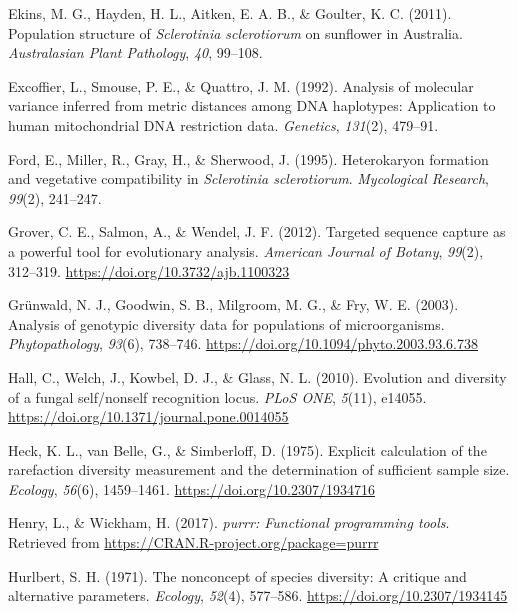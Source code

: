 \documentclass[fleqn,10pt,lineno]{wlpeerj} %
\theoremstyle{definition}
\theoremstyle{definition}
\theoremstyle{definition}
\theoremstyle{remark}
\begin{document}
\hypertarget{ref-ekins2011population}{}
Ekins, M. G., Hayden, H. L., Aitken, E. A. B., \& Goulter, K. C. (2011).
Population structure of \emph{Sclerotinia sclerotiorum} on sunflower in
Australia. \emph{Australasian Plant Pathology}, \emph{40}, 99--108.

\hypertarget{ref-excoffier1992analysis}{}
Excoffier, L., Smouse, P. E., \& Quattro, J. M. (1992). Analysis of
molecular variance inferred from metric distances among DNA haplotypes:
Application to human mitochondrial DNA restriction data.
\emph{Genetics}, \emph{131}(2), 479--91.

\hypertarget{ref-ford1995heterokaryon}{}
Ford, E., Miller, R., Gray, H., \& Sherwood, J. (1995). Heterokaryon
formation and vegetative compatibility in \emph{Sclerotinia
sclerotiorum}. \emph{Mycological Research}, \emph{99}(2), 241--247.

\hypertarget{ref-grover2012targeted}{}
Grover, C. E., Salmon, A., \& Wendel, J. F. (2012). Targeted sequence
capture as a powerful tool for evolutionary analysis. \emph{American
Journal of Botany}, \emph{99}(2), 312--319.
\url{https://doi.org/10.3732/ajb.1100323}

\hypertarget{ref-grunwald2003analysis}{}
Grünwald, N. J., Goodwin, S. B., Milgroom, M. G., \& Fry, W. E. (2003).
Analysis of genotypic diversity data for populations of microorganisms.
\emph{Phytopathology}, \emph{93}(6), 738--746.
\url{https://doi.org/10.1094/phyto.2003.93.6.738}

\hypertarget{ref-hall2010evolution}{}
Hall, C., Welch, J., Kowbel, D. J., \& Glass, N. L. (2010). Evolution
and diversity of a fungal self/nonself recognition locus. \emph{PLoS
ONE}, \emph{5}(11), e14055.
\url{https://doi.org/10.1371/journal.pone.0014055}

\hypertarget{ref-heck1975explicit}{}
Heck, K. L., van Belle, G., \& Simberloff, D. (1975). Explicit
calculation of the rarefaction diversity measurement and the
determination of sufficient sample size. \emph{Ecology}, \emph{56}(6),
1459--1461. \url{https://doi.org/10.2307/1934716}

\hypertarget{ref-purrr}{}
Henry, L., \& Wickham, H. (2017). \emph{purrr: Functional programming
tools}. Retrieved from \url{https://CRAN.R-project.org/package=purrr}

\hypertarget{ref-hurlbert1971nonconcept}{}
Hurlbert, S. H. (1971). The nonconcept of species diversity: A critique
and alternative parameters. \emph{Ecology}, \emph{52}(4), 577--586.
\url{https://doi.org/10.2307/1934145}
\end{document}
